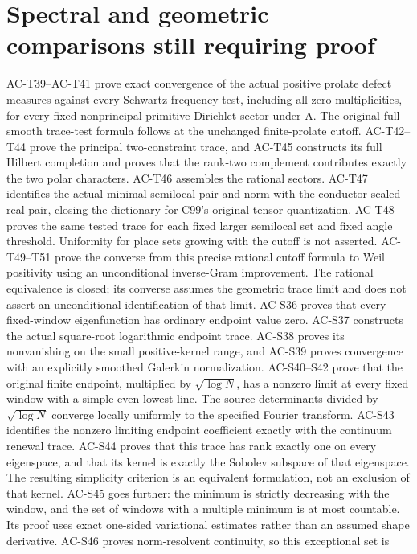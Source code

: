 \documentclass[11pt,a4paper]{article}
\theoremstyle{definition}
\theoremstyle{remark}
\begin{document}
\section{Spectral and geometric comparisons still requiring proof}
AC-T39--AC-T41 prove exact convergence of the actual positive
prolate defect measures against every Schwartz frequency test,
including all zero multiplicities, for every fixed nonprincipal
primitive Dirichlet sector under A. The original full smooth
trace-test formula follows at the unchanged finite-prolate cutoff.
AC-T42--T44 prove the principal two-constraint trace, and AC-T45
constructs its full Hilbert completion and proves that the
rank-two complement contributes exactly the two polar characters.
AC-T46 assembles the rational sectors. AC-T47 identifies the
actual minimal semilocal pair and norm with the conductor-scaled
real pair, closing the dictionary for C99's original tensor
quantization. AC-T48 proves the same tested trace for each
fixed larger semilocal set and fixed angle threshold. Uniformity
for place sets growing with the cutoff is not asserted.
AC-T49--T51 prove the converse from this precise rational
cutoff formula to Weil positivity using an unconditional
inverse-Gram improvement.  The rational equivalence is closed;
its converse assumes the geometric trace limit and does not
assert an unconditional identification of that limit.
AC-S36 proves that every fixed-window eigenfunction has ordinary
endpoint value zero. AC-S37 constructs the actual square-root
logarithmic endpoint trace. AC-S38 proves its nonvanishing on
the small positive-kernel range, and AC-S39 proves convergence
with an explicitly smoothed Galerkin normalization. AC-S40--S42
prove that the original finite endpoint, multiplied by
$\sqrt{\log N}$, has a nonzero limit at every fixed window
with a simple even lowest line. The source determinants divided
by $\sqrt{\log N}$ converge locally uniformly to the specified
Fourier transform. AC-S43 identifies the nonzero limiting endpoint
coefficient exactly with the continuum renewal trace. AC-S44 proves
that this trace has rank exactly one on every eigenspace, and that
its kernel is exactly the Sobolev subspace of that eigenspace.
The resulting simplicity criterion is an equivalent formulation,
not an exclusion of that kernel. AC-S45 goes further: the minimum is
strictly decreasing with the window, and the set of windows with
a multiple minimum is at most countable. Its proof uses exact
one-sided variational estimates rather than an assumed shape derivative.
AC-S46 proves norm-resolvent continuity, so this exceptional set is
\end{document}
